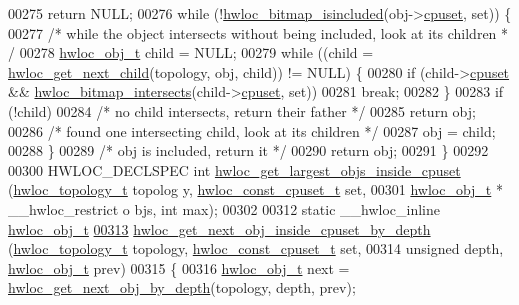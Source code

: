 \begin{DoxyCode}
00275     \textcolor{keywordflow}{return} NULL;
00276   \textcolor{keywordflow}{while} (!\hyperlink{a00065_gaae29e14a926c198e8f91e6e4790621e7}{hwloc_bitmap_isincluded}(obj->\hyperlink{a00016_a67925e0f2c47f50408fbdb9bddd0790f}{cpuset}, \textcolor{keyword}{set})) \{
00277     \textcolor{comment}{/* while the object intersects without being included, look at its children *
      /}
00278     \hyperlink{a00016}{hwloc_obj_t} child = NULL;
00279     \textcolor{keywordflow}{while} ((child = \hyperlink{a00053_gae5ef1af636849f77714e1584ba78cf9c}{hwloc_get_next_child}(topology, obj, child)) != NULL) \{
00280       \textcolor{keywordflow}{if} (child->\hyperlink{a00016_a67925e0f2c47f50408fbdb9bddd0790f}{cpuset} && \hyperlink{a00065_ga575c27953709a8cb9a047aae65157526}{hwloc_bitmap_intersects}(child->\hyperlink{a00016_a67925e0f2c47f50408fbdb9bddd0790f}{cpuset}, \textcolor{keyword}{set}))
00281         \textcolor{keywordflow}{break};
00282     \}
00283     \textcolor{keywordflow}{if} (!child)
00284       \textcolor{comment}{/* no child intersects, return their father */}
00285       \textcolor{keywordflow}{return} obj;
00286     \textcolor{comment}{/* found one intersecting child, look at its children */}
00287     obj = child;
00288   \}
00289   \textcolor{comment}{/* obj is included, return it */}
00290   \textcolor{keywordflow}{return} obj;
00291 \}
00292 
00300 HWLOC\_DECLSPEC \textcolor{keywordtype}{int} \hyperlink{a00054_gaab04c89623662e63a48ed2cd48eb601c}{hwloc_get_largest_objs_inside_cpuset} (\hyperlink{a00039_ga9d1e76ee15a7dee158b786c30b6a6e38}{hwloc_topology_t} topolog
      y, \hyperlink{a00040_ga1f784433e9b606261f62d1134f6a3b25}{hwloc_const_cpuset_t} \textcolor{keyword}{set},
00301                                                  \hyperlink{a00016}{hwloc_obj_t} * \_\_hwloc\_restrict o
      bjs, \textcolor{keywordtype}{int} max);
00302 
00312 \textcolor{keyword}{static} \_\_hwloc\_inline \hyperlink{a00016}{hwloc_obj_t}
\hypertarget{a00031_source_l00313}{}\hyperlink{a00054_ga8af256c2572f16520f95440b884c1bd6}{00313} \hyperlink{a00054_ga8af256c2572f16520f95440b884c1bd6}{hwloc_get_next_obj_inside_cpuset_by_depth} (\hyperlink{a00039_ga9d1e76ee15a7dee158b786c30b6a6e38}{hwloc_topology_t} topology, 
      \hyperlink{a00040_ga1f784433e9b606261f62d1134f6a3b25}{hwloc_const_cpuset_t} \textcolor{keyword}{set},
00314                                            \textcolor{keywordtype}{unsigned} depth, \hyperlink{a00016}{hwloc_obj_t} prev)
00315 \{
00316   \hyperlink{a00016}{hwloc_obj_t} next = \hyperlink{a00053_gab7c1dce3f42ece5bfa621e87cf332418}{hwloc_get_next_obj_by_depth}(topology, depth, prev);

\end{DoxyCode}
